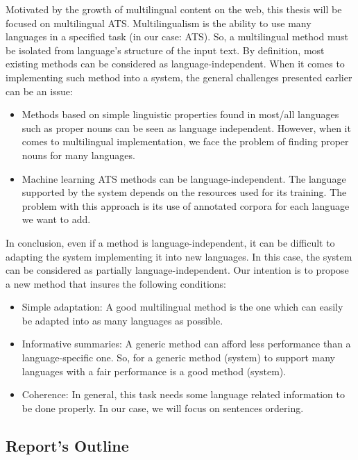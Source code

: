 \documentclass[12pt, oneside, a4paper]{article}
\begin{document}
Motivated by the growth of multilingual content on the web, this thesis will be focused on multilingual ATS.
Multilingualism is the ability to use many languages in a specified task (in our case: ATS).
So, a multilingual method must be isolated from language's structure of the input text. 
By definition, most existing methods can be considered as language-independent. 
When it comes to implementing such method into a system, the general challenges presented earlier can be an issue:
\begin{itemize}
	\item Methods based on simple linguistic properties found in most/all languages such as proper nouns can be seen as language independent.
	However, when it comes to multilingual implementation, we face the problem of finding proper nouns for many languages. 
	\item Machine learning ATS methods can be language-independent.
	The language supported by the system depends on the resources used for its training. 
	The problem with this approach is its use of annotated corpora for each language we want to add. 
	
\end{itemize}

In conclusion, even if a method is language-independent, it can be difficult to adapting the system implementing it into new languages.
In this case, the system can be considered as partially language-independent. 
Our intention is to propose a new method that insures the following conditions:
\begin{itemize}
	\item Simple adaptation: 
	A good multilingual method is the one which can easily be adapted into as many languages as possible. 
	
	\item Informative summaries: 
	A generic method can afford less performance than a language-specific one. 
	So, for a generic method (system) to support many languages with a fair performance is a good method (system). 
	
	\item Coherence: In general, this task needs some language related information to be done properly. 
	In our case, we will focus on sentences ordering.
	
\end{itemize}

\subsection{Report's Outline}
\end{document}
